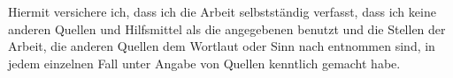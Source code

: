 \begin{center}Hiermit versichere ich, dass ich die Arbeit selbstständig verfasst, dass ich keine anderen Quellen und Hilfsmittel als die angegebenen benutzt und die Stellen der Arbeit, die anderen Quellen dem Wortlaut oder Sinn nach entnommen sind, in jedem einzelnen Fall unter Angabe von Quellen kenntlich gemacht habe.
\end{center}